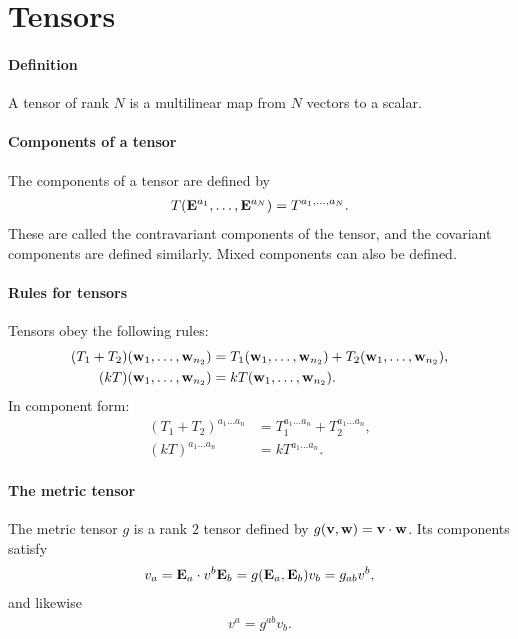 \section{Tensors}

\paragraph{Definition}
A tensor of rank $N$ is a multilinear map from $N$ vectors to a scalar.

\paragraph{Components of a tensor}
The components of a tensor are defined by
\begin{align*}
	T(\vb{E}^{a_{1}}, \dots, \vb{E}^{a_{N}}) = T^{a_{1}, \dots, a_{N}}.
\end{align*}
These are called the contravariant components of the tensor, and the covariant components are defined similarly. Mixed components can also be defined.

\paragraph{Rules for tensors}
Tensors obey the following rules:
\begin{align*}
	(T_{1} + T_{2})(\vb{w}_{1}, \dots, \vb{w}_{n_{2}}) &= T_{1}(\vb{w}_{1}, \dots, \vb{w}_{n_{2}}) + T_{2}(\vb{w}_{1}, \dots, \vb{w}_{n_{2}}), \\
	(kT)(\vb{w}_{1}, \dots, \vb{w}_{n_{2}})            &= kT(\vb{w}_{1}, \dots, \vb{w}_{n_{2}}).
\end{align*}
In component form:
\begin{align*}
	(T_{1} + T_{2})^{a_{1}\dots a_{n}} &= T_{1}^{a_{1}\dots a_{n}} + T_{2}^{a_{1}\dots a_{n}}, \\
	(kT)^{a_{1}\dots a_{n}}            &= kT^{a_{1}\dots a_{n}}.
\end{align*}

\paragraph{The metric tensor}
The metric tensor $g$ is a rank $2$ tensor defined by $g(\vb{v}, \vb{w}) = \vb{v}\cdot\vb{w}$. Its components satisfy
\begin{align*}
	v_{a} = \vb{E}_{a}\cdot v^{b}\vb{E}_{b} = g(\vb{E}_{a}, \vb{E}_{b})v_{b} = g_{ab}v^{b},
\end{align*}
and likewise
\begin{align*}
	v^{a} = g^{ab}v_{b}.
\end{align*}

